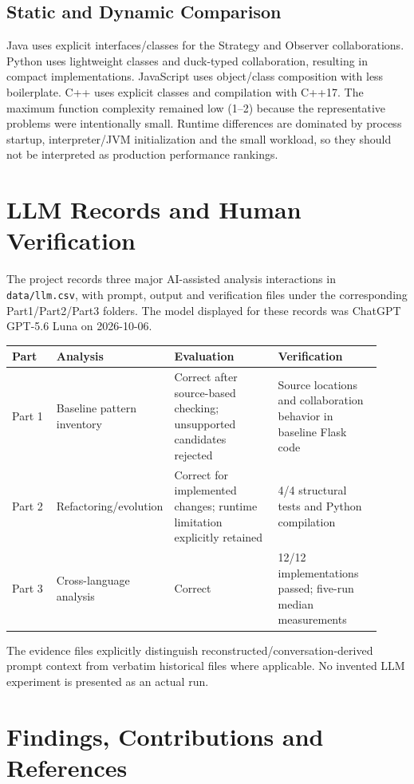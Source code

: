 \documentclass[11pt,a4paper]{article}
\begin{document}
\subsection{Static and Dynamic Comparison}
Java uses explicit interfaces/classes for the Strategy and Observer collaborations. Python uses lightweight classes and duck-typed collaboration, resulting in compact implementations. JavaScript uses object/class composition with less boilerplate. C++ uses explicit classes and compilation with C++17. The maximum function complexity remained low (1--2) because the representative problems were intentionally small. Runtime differences are dominated by process startup, interpreter/JVM initialization and the small workload, so they should not be interpreted as production performance rankings.

\section{LLM Records and Human Verification}
The project records three major AI-assisted analysis interactions in \texttt{data/llm.csv}, with prompt, output and verification files under the corresponding Part1/Part2/Part3 folders. The model displayed for these records was ChatGPT GPT-5.6 Luna on 2026-10-06.

\begin{longtable}{p{0.12\linewidth}p{0.22\linewidth}p{0.29\linewidth}p{0.29\linewidth}}
\toprule
Part & Analysis & Evaluation & Verification\\
\midrule
Part 1 & Baseline pattern inventory & Correct after source-based checking; unsupported candidates rejected & Source locations and collaboration behavior in baseline Flask code\\
Part 2 & Refactoring/evolution & Correct for implemented changes; runtime limitation explicitly retained & 4/4 structural tests and Python compilation\\
Part 3 & Cross-language analysis & Correct & 12/12 implementations passed; five-run median measurements\\
\bottomrule
\end{longtable}

The evidence files explicitly distinguish reconstructed/conversation-derived prompt context from verbatim historical files where applicable. No invented LLM experiment is presented as an actual run.

\section{Findings, Contributions and References}
\end{document}
